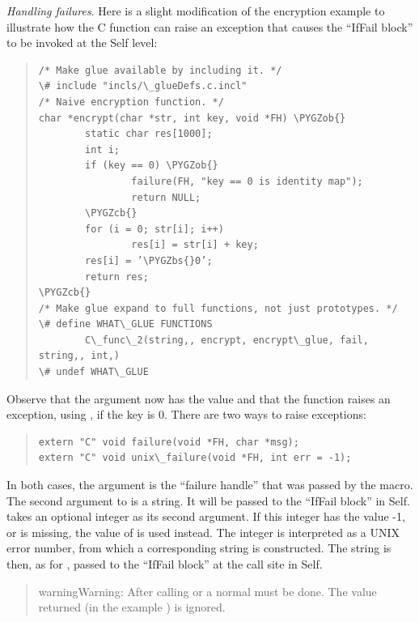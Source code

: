 \documentclass[letterpaper,10pt,english]{sphinxmanual}
\def\PYGZbs{\char`\\}
\def\PYGZob{\char`\{}
\def\PYGZcb{\char`\}}
\begin{document}
\emph{Handling failures}. Here is a slight modification of the encryption example to illustrate how the C function can raise an exception that causes the “IfFail block” to be invoked at the Self level:
\begin{quote}

\begin{Verbatim}[commandchars=\\\{\}]
/* Make glue available by including it. */
\# include "incls/\_glueDefs.c.incl"
/* Naive encryption function. */
char *encrypt(char *str, int key, void *FH) \PYGZob{}
        static char res[1000];
        int i;
        if (key == 0) \PYGZob{}
                failure(FH, "key == 0 is identity map");
                return NULL;
        \PYGZcb{}
        for (i = 0; str[i]; i++)
                res[i] = str[i] + key;
        res[i] = ’\PYGZbs{}0’;
        return res;
\PYGZcb{}
/* Make glue expand to full functions, not just prototypes. */
\# define WHAT\_GLUE FUNCTIONS
        C\_func\_2(string,, encrypt, encrypt\_glue, fail, string,, int,)
\# undef WHAT\_GLUE
\end{Verbatim}
\end{quote}

Observe that the  argument now has the value  and that the  function
raises an exception, using , if the key is 0. There are two ways to raise exceptions:
\begin{quote}

\begin{Verbatim}[commandchars=\\\{\}]
extern "C" void failure(void *FH, char *msg);
extern "C" void unix\_failure(void *FH, int err = -1);
\end{Verbatim}
\end{quote}

In both cases, the  argument is the “failure handle” that was passed by the  macro.
The second argument to  is a string. It will be passed to the “IfFail block” in Self.
 takes an optional integer as its second argument. If this integer has the value -1,
or is missing, the value of  is used instead. The integer is interpreted as a UNIX error number,
from which a corresponding string is constructed. The string is then, as for , passed
to the “IfFail block” at the call site in Self.
\begin{quote}

\begin{notice}{warning}{Warning:}
After calling  or  a normal  must be done. The value returned (in the example ) is ignored.
\end{notice}
\end{quote}
\end{document}
